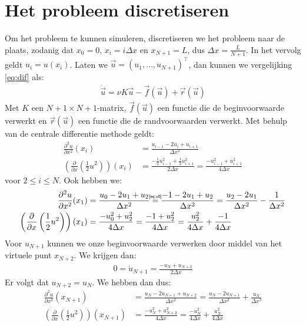 \documentclass{article}
\newcommand{\myeq}[2]{\stackrel{\mathclap{\mbox{\normalfont\tiny\sffamily#1}}}{#2}}
\begin{document}
\section*{Het probleem discretiseren}
Om het probleem te kunnen simuleren, discretiseren we het probleem naar de plaats, zodanig dat $x_0 = 0$, $x_i= i \Delta x$ en $x_{N+1}=L$, dus $\Delta x = \frac{L}{N+1}$.
In het vervolg geldt $u_i=u(x_i)$.
Laten we $\vec{u} = (u_1,\dots,u_{N+1})^\intercal$, dan kunnen we vergelijking \eqref{eq:dif} als:
\begin{align}
\dot{\vec{u}} = \nu K \vec{u} - \vec{f}(\vec{u})+\vec{r}(\vec{u})
\end{align}
Met \(K\) een \(N+1\times N+1\)-matrix, \(\vec{f}(\vec{u})\) een functie die de beginvoorwaarde verwerkt en \(\vec{r}(\vec{u})\) een functie die de randvoorwaarden verwerkt.
Met behulp van de centrale differentie methode geldt:
\begin{align*}
\frac{\partial^2 u}{\partial x^2}(x_i) &= \frac{u_{i-1}-2u_i+u_{i+1}}{\Delta x^2}\\
\left(\frac{\partial}{\partial x}\left(\frac{1}{2}u^2\right)\right)(x_i) &= \frac{-\frac{1}{2}u_{i-1}^2+\frac{1}{2}u_{i+1}^2}{2\Delta x}
= \frac{-u_{i-1}^2+u_{i+1}^2}{4\Delta x}
\end{align*}
voor $2\leq i\leq N$.
Ook hebben we:
\begin{align*}
\frac{\partial^2 u}{\partial x^2}(x_1) &= \frac{u_{0}-2u_1+u_{2}}{\Delta x^2}
\myeq{\eqref{eq:u0}}{=} \frac{-1-2u_1+u_{2}}{\Delta x^2}
= \frac{u_{2}-2u_1}{\Delta x^2} -\frac{1}{\Delta x^2}\\
\left(\frac{\partial}{\partial x}\left(\frac{1}{2}u^2\right)\right)(x_1) &= \frac{-u_{0}^2+u_{2}^2}{4\Delta x}
= \frac{-1+u_{2}^2}{4\Delta x}
= \frac{u_{2}^2}{4\Delta x}+\frac{-1}{4\Delta x}
\end{align*}
Voor $u_{N+1}$ kunnen we onze beginvoorwaarde verwerken door middel van het virtuele punt $x_{N+2}$.
We krijgen dan:
\begin{align*}
0=\dot{u}_{N+1} = \frac{-u_{N}+u_{N+2}}{2\Delta x}
\end{align*}
Er volgt dat $u_{N+2}=u_N$.
We hebben dan dus:
\begin{align*}
\frac{\partial^2 u}{\partial x^2}(x_{N+1}) &= \frac{u_{N}-2u_{N+1}+u_{N+2}}{\Delta x^2}
= \frac{u_{N}-2u_{N+1}}{\Delta x^2} +\frac{u_{N}}{\Delta x^2}\\
\left(\frac{\partial}{\partial x}\left(\frac{1}{2}u^2\right)\right)(x_{N+1}) &= \frac{-u_{N}^2+u_{N+2}^2}{4\Delta x}
= \frac{-u_{N}^2}{4\Delta x} +\frac{u_{N}^2}{4\Delta x}
\end{align*}
\end{document}
